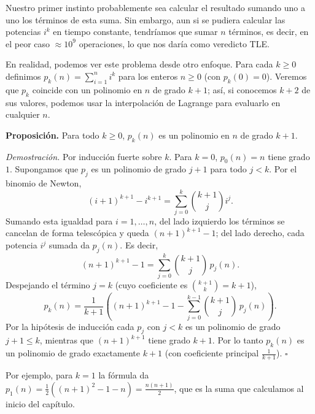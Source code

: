 Nuestro primer instinto probablemente sea calcular el resultado sumando uno a uno los términos de esta suma. Sin embargo, aun si se pudiera calcular las potencias $i^k$ en tiempo constante, tendríamos que sumar $n$ términos, es decir, en el peor caso $\approx 10^9$ operaciones, lo que nos daría como veredicto TLE.

En realidad, podemos ver este problema desde otro enfoque. Para cada $k \ge 0$ definimos $p_k(n)=\sum_{i=1}^{n} i^k$ para los enteros $n \ge 0$ (con $p_k(0)=0$). Veremos que $p_k$ coincide con un polinomio en $n$ de grado $k+1$; así, si conocemos $k+2$ de sus valores, podemos usar la interpolación de Lagrange para evaluarlo en cualquier $n$.

\textbf{Proposición.} Para todo $k\ge 0$, $p_k(n)$ es un polinomio en $n$ de grado $k+1$.

\textit{Demostración.} Por inducción fuerte sobre $k$. Para $k=0$, $p_0(n)=n$ tiene grado $1$. Supongamos que $p_j$ es un polinomio de grado $j+1$ para todo $j<k$. Por el binomio de Newton,
\[
(i+1)^{k+1}-i^{k+1}=\sum_{j=0}^{k}\binom{k+1}{j} i^j .
\]
Sumando esta igualdad para $i=1,\dots,n$, del lado izquierdo los términos se cancelan de forma telescópica y queda $(n+1)^{k+1}-1$; del lado derecho, cada potencia $i^j$ sumada da $p_j(n)$. Es decir,
\[
(n+1)^{k+1}-1=\sum_{j=0}^{k}\binom{k+1}{j}\,p_j(n).
\]
Despejando el término $j=k$ (cuyo coeficiente es $\binom{k+1}{k}=k+1$),
\[
p_k(n)=\frac{1}{k+1}\left((n+1)^{k+1}-1-\sum_{j=0}^{k-1}\binom{k+1}{j}\,p_j(n)\right).
\]
Por la hipótesis de inducción cada $p_j$ con $j<k$ es un polinomio de grado $j+1\le k$, mientras que $(n+1)^{k+1}$ tiene grado $k+1$. Por lo tanto $p_k(n)$ es un polinomio de grado exactamente $k+1$ (con coeficiente principal $\frac{1}{k+1}$). $\square$

Por ejemplo, para $k=1$ la fórmula da $p_1(n)=\frac12\left((n+1)^2-1-n\right)=\frac{n(n+1)}{2}$, que es la suma que calculamos al inicio del capítulo.

